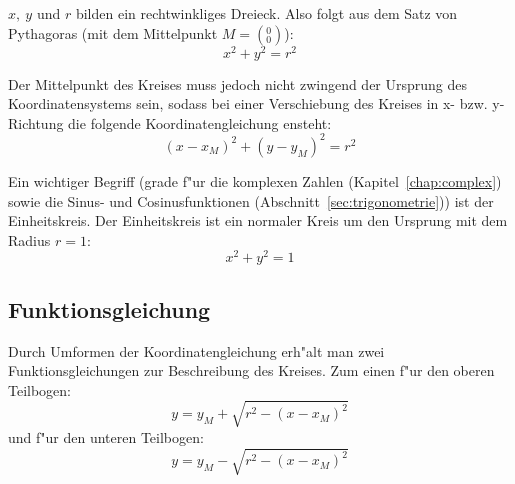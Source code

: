 \noindent $x,\ y$ und $r$ bilden ein rechtwinkliges Dreieck. Also folgt aus dem Satz von Pythagoras (mit dem Mittelpunkt $M = \left({}^0_0\right)$):
\[ x^2 + y^2 = r^2 \]

\noindent Der Mittelpunkt des Kreises muss jedoch nicht zwingend der Ursprung des Koordinatensystems sein, sodass bei einer Verschiebung des Kreises in x- bzw. y-Richtung die folgende  Koordinatengleichung ensteht:
\[ (x - x_M)^2 + (y - y_M)^2 = r^2 \]

\noindent Ein wichtiger Begriff (grade f"ur die komplexen Zahlen (Kapitel~\ref{chap:complex}) sowie die Sinus- und Cosinusfunktionen (Abschnitt~\ref{sec:trigonometrie})) ist der Einheitskreis. Der Einheitskreis ist ein normaler Kreis um den Ursprung mit dem Radius $r=1$:
\[ x^2 + y^2 = 1 \]

\subsection{Funktionsgleichung}
Durch Umformen der Koordinatengleichung erh"alt man zwei Funktionsgleichungen zur Beschreibung des Kreises. Zum einen f"ur den oberen Teilbogen:
\[ y = y_M + \sqrt{ r^2 - (x - x_M)^2} \]
und f"ur den unteren Teilbogen:
\[ y = y_M - \sqrt{ r^2 - (x - x_M)^2} \]

